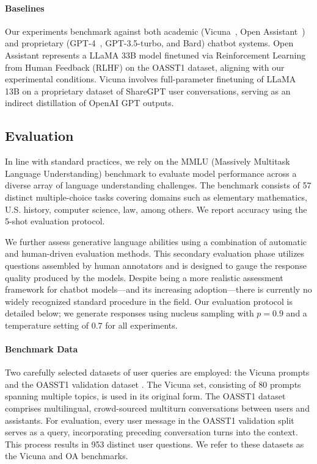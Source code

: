 \paragraph{Baselines} Our experiments benchmark against both academic (Vicuna~\citep{vicuna2023}, Open Assistant~\citep{kopf2023openassistant}) and proprietary (GPT-4~\citep{openai2023gpt}, GPT-3.5-turbo, and Bard) chatbot systems. Open Assistant represents a LLaMA 33B model finetuned via Reinforcement Learning from Human Feedback (RLHF) on the OASST1 dataset, aligning with our experimental conditions. Vicuna involves full-parameter finetuning of LLaMA 13B on a proprietary dataset of ShareGPT user conversations, serving as an indirect distillation of OpenAI GPT outputs.

\subsection{Evaluation}

In line with standard practices, we rely on the MMLU (Massively Multitask Language Understanding) benchmark \citep{hendrycksmeasuring} to evaluate model performance across a diverse array of language understanding challenges. The benchmark consists of 57 distinct multiple-choice tasks covering domains such as elementary mathematics, U.S. history, computer science, law, among others. We report accuracy using the 5-shot evaluation protocol.

We further assess generative language abilities using a combination of automatic and human-driven evaluation methods. This secondary evaluation phase utilizes questions assembled by human annotators and is designed to gauge the response quality produced by the models. Despite being a more realistic assessment framework for chatbot models—and its increasing adoption—there is currently no widely recognized standard procedure in the field. Our evaluation protocol is detailed below; we generate responses using nucleus sampling with $p=0.9$ and a temperature setting of $0.7$ for all experiments.

\paragraph{Benchmark Data} Two carefully selected datasets of user queries are employed: the Vicuna prompts \citep{vicuna2023} and the OASST1 validation dataset \citep{kopf2023openassistant}. The Vicuna set, consisting of 80 prompts spanning multiple topics, is used in its original form. The OASST1 dataset comprises multilingual, crowd-sourced multiturn conversations between users and assistants. For evaluation, every user message in the OASST1 validation split serves as a query, incorporating preceding conversation turns into the context. This process results in 953 distinct user questions. We refer to these datasets as the Vicuna and OA benchmarks.

